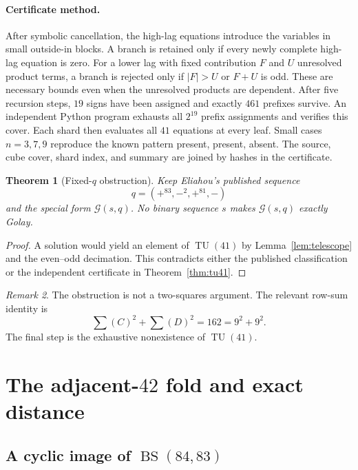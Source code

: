 \documentclass[11pt]{article}
\newtheorem{theorem}{Theorem}[section]
\theoremstyle{remark}
\newtheorem{remark}[theorem]{Remark}
\newcommand{\BS}{\operatorname{BS}}
\newcommand{\TU}{\operatorname{TU}}
\begin{document}
\paragraph{Certificate method.}
After symbolic cancellation, the high-lag equations introduce the
variables in small outside-in blocks.  A branch is retained only if every
newly complete high-lag equation is zero.  For a lower lag with fixed
contribution $F$ and $U$ unresolved product terms, a branch is rejected
only if $|F|>U$ or $F+U$ is odd.  These are necessary bounds even when the
unresolved products are dependent.  After five recursion steps, $19$
signs have been assigned and exactly $461$ prefixes survive.  An
independent Python program exhausts all $2^{19}$ prefix assignments and
verifies this cover.  Each shard then evaluates all $41$ equations at
every leaf.  Small cases $n=3,7,9$ reproduce the known pattern
present, present, absent.  The source, cube cover, shard index, and summary
are joined by hashes in the certificate.

\begin{theorem}[Fixed-$q$ obstruction]\label{thm:fixedq}
Keep Eliahou's published sequence
\[
 q=(+^{83},-^2,+^{81},-)
\]
and the special form $\mathcal G(s,q)$.  No binary sequence $s$ makes
$\mathcal G(s,q)$ exactly Golay.
\end{theorem}

\begin{proof}
A solution would yield an element of $\TU(41)$ by
Lemma~\ref{lem:telescope} and the even--odd decimation.  This contradicts
either the published classification~\cite{edmondson} or the independent
certificate in Theorem~\ref{thm:tu41}.
\end{proof}

\begin{remark}
The obstruction is not a two-squares argument.  The relevant row-sum
identity is
\[
 \sum(C)^2+\sum(D)^2=162=9^2+9^2.
\]
The final step is the exhaustive nonexistence of $\TU(41)$.
\end{remark}

\section{The adjacent-\texorpdfstring{$42$}{42} fold and exact distance}
\label{sec:distance}

\subsection{A cyclic image of \texorpdfstring{$\BS(84,83)$}{BS(84,83)}}
\end{document}
